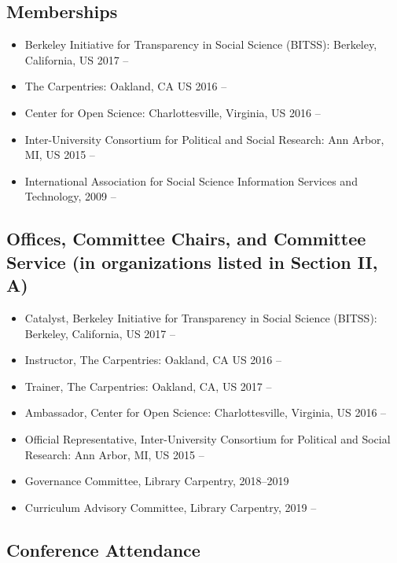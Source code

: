 \subsection{Memberships}

\begin{itemize}[label={},leftmargin=!,labelindent=5pt,itemindent=-15pt]
  \item Berkeley Initiative for Transparency in Social Science (BITSS): Berkeley, California, US 2017 --
  \item The Carpentries: Oakland, CA US 2016 --
  \item Center for Open Science: Charlottesville, Virginia, US 2016 --
  \item Inter-University Consortium for Political and Social Research: Ann Arbor, MI, US 2015 --
  \item International Association for Social Science Information Services and Technology, 2009 --
\end{itemize}

\subsection{Offices, Committee Chairs, and Committee Service (in organizations listed in Section II, A)}

\begin{itemize}[label={},leftmargin=!,labelindent=5pt,itemindent=-15pt]
    \item Catalyst, Berkeley Initiative for Transparency in Social Science (BITSS): Berkeley, California, US 2017 --
    \item Instructor, The Carpentries: Oakland, CA US 2016 --
    \item Trainer, The Carpentries: Oakland, CA, US  2017 --
    \item Ambassador, Center for Open Science: Charlottesville, Virginia, US 2016 --
    \item Official Representative, Inter-University Consortium for Political and Social Research: Ann Arbor, MI, US 2015 --
    \item Governance Committee, Library Carpentry, 2018--2019
    \item Curriculum Advisory Committee, Library Carpentry, 2019 --
\end{itemize}

\subsection{Conference Attendance}

